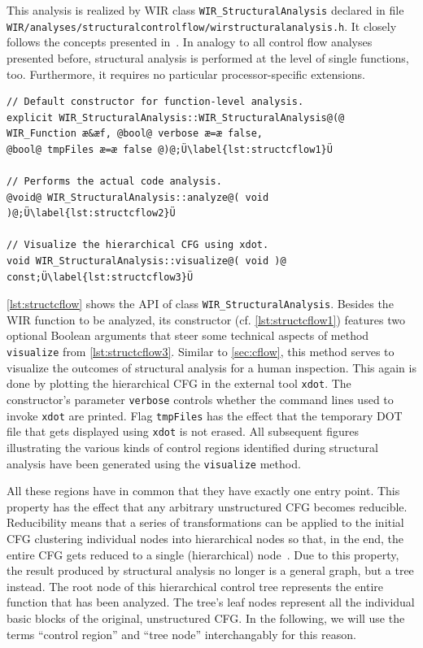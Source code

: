 This analysis is realized by \gls{WIR} class \texttt{WIR\_StructuralAnalysis} declared in file \texttt{WIR/analyses/structural\-controlflow/wirstructuralanalysis.h}.
It closely follows the concepts presented in~\cite[chapter~7.7]{Much97}.
In analogy to all control flow analyses presented before, structural analysis is performed at the level of single functions, too.
Furthermore, it requires no particular processor-specific extensions.

\begin{lstlisting}[style=code,float=!b,caption={Public Interface of Class \texttt{WIR\_StructuralAnalysis}},label=lst:structcflow]
// Default constructor for function-level analysis.
explicit WIR_StructuralAnalysis::WIR_StructuralAnalysis@(@ WIR_Function æ&æf, @bool@ verbose æ=æ false,                                                                    @bool@ tmpFiles æ=æ false @)@;Ü\label{lst:structcflow1}Ü

// Performs the actual code analysis.
@void@ WIR_StructuralAnalysis::analyze@( void )@;Ü\label{lst:structcflow2}Ü

// Visualize the hierarchical CFG using xdot.
void WIR_StructuralAnalysis::visualize@( void )@ const;Ü\label{lst:structcflow3}Ü
\end{lstlisting}

\cref{lst:structcflow} shows the \gls{API} of class \texttt{WIR\_StructuralAnalysis}.
Besides the \gls{WIR} function to be analyzed, its constructor (cf. \cref{lst:structcflow1}) features two optional Boolean arguments that steer some technical aspects of method \texttt{visualize} from \cref{lst:structcflow3}.
Similar to \cref{sec:cflow}, this method serves to visualize the outcomes of structural analysis for a human inspection.
This again is done by plotting the hierarchical \gls{CFG} in the external tool \texttt{xdot}.
The constructor's parameter \texttt{verbose} controls whether the command lines used to invoke \texttt{xdot} are printed.
Flag \texttt{tmpFiles} has the effect that the temporary DOT file that gets displayed using \texttt{xdot} is not erased.
All subsequent figures illustrating the various kinds of control regions identified during structural analysis have been generated using the \texttt{visualize} method.

All these regions have in common that they have exactly one entry point.
This property has the effect that any arbitrary unstructured \gls{CFG} becomes reducible.
Reducibility means that a series of transformations can be applied to the initial \gls{CFG} clustering individual nodes into hierarchical nodes so that, in the end, the entire \gls{CFG} gets reduced to a single (hierarchical) node~\cite[chapter~7.5]{Much97}.
Due to this property, the result produced by structural analysis no longer is a general graph, but a tree instead.
The root node of this hierarchical control tree represents the entire function that has been analyzed.
The tree's leaf nodes represent all the individual basic blocks of the original, unstructured \gls{CFG}.
In the following, we will use the terms ``control region'' and ``tree node'' interchangably for this reason.

